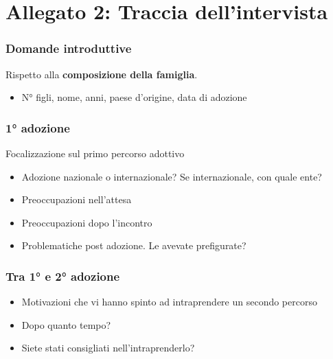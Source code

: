\documentclass[12pt,oneside,svgnames]{memoir}
\begin{document}
\section{Allegato 2: Traccia
dell'intervista}\label{allegato-2-traccia-dellintervista}

\subsubsection*{Domande introduttive}\label{domande-introduttive}

Rispetto alla \textbf{composizione della famiglia}.

\begin{itemize}
\itemsep1pt\parskip0pt
\item
  N° figli, nome, anni, paese d'origine, data di adozione
\end{itemize}

\subsubsection*{1° adozione}\label{adozione}

Focalizzazione sul primo percorso adottivo

\begin{itemize}
\item
  Adozione nazionale o internazionale? Se internazionale, con quale
  ente?
\item
  Preoccupazioni nell'attesa
\item
  Preoccupazioni dopo l'incontro
\item
  Problematiche post adozione. Le avevate prefigurate?
\end{itemize}

\subsubsection*{Tra 1° e 2° adozione}\label{tra-1-e-2-adozione}

\begin{itemize}
\item
  Motivazioni che vi hanno spinto ad intraprendere un secondo percorso
\item
  Dopo quanto tempo?
\item
  Siete stati consigliati nell'intraprenderlo?
\end{itemize}
\end{document}
